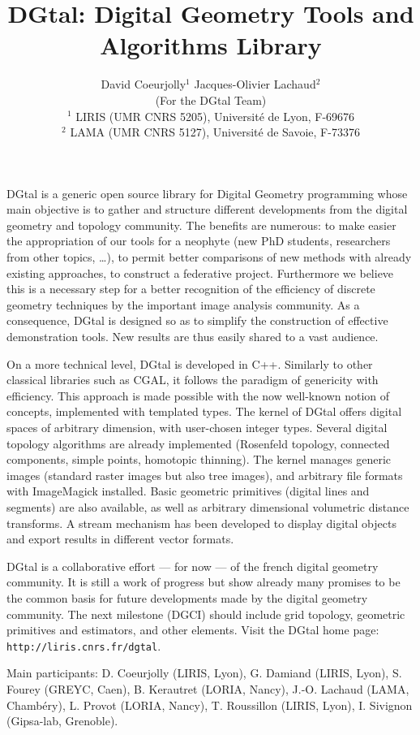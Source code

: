 \documentclass{article}
\title{DGtal: Digital  Geometry Tools and Algorithms Library}
\author{David Coeurjolly$^1$ \qquad \qquad Jacques-Olivier Lachaud$^2$ \\
  (For the DGtal Team)\\
${}^1$ LIRIS (UMR CNRS 5205), Universit\'{e} de Lyon, F-69676 \\
${}^2$ LAMA (UMR CNRS 5127), Universit\'{e} de Savoie, F-73376\\
}
\date{}
\begin{document}
\maketitle

DGtal is a generic open source library for Digital Geometry
programming whose main objective is to gather and structure different
developments from the digital geometry and topology community. The
benefits are numerous: to make easier the appropriation of our tools
for a neophyte (new PhD students, researchers from other topics,
\ldots), to permit better comparisons of new methods with already
existing approaches, to construct a federative project. Furthermore we
believe this is a necessary step for a better recognition of the
efficiency of discrete geometry techniques by the important image
analysis community. As a consequence, DGtal is designed so as to
simplify the construction of effective demonstration tools. New
results are thus easily shared to a vast audience. 

On a more technical level, DGtal is developed in C++. Similarly to
other classical libraries such as CGAL, it follows the paradigm of
genericity with efficiency. This approach is made possible with the
now well-known notion of concepts, implemented with templated
types. The kernel of DGtal offers digital spaces of arbitrary
dimension, with user-chosen integer types. Several digital topology
algorithms are already implemented (Rosenfeld topology, connected
components, simple points, homotopic thinning). The kernel manages
generic images (standard raster images but also tree images), and
arbitrary file formats with ImageMagick installed. Basic geometric
primitives (digital lines and segments) are also available, as well as
arbitrary dimensional volumetric distance transforms. A stream
mechanism has been developed to display digital objects and export
results in different vector formats.

DGtal is a collaborative effort --- for now --- of the french digital
geometry community. It is still a work of progress but show already
many promises to be the common basis for future developments made by
the digital geometry community. The next milestone (DGCI) should
include grid topology, geometric primitives and estimators, and other
elements. Visit the DGtal home page: \texttt{http://liris.cnrs.fr/dgtal}.

Main participants: D. Coeurjolly (LIRIS, Lyon), G. Damiand (LIRIS,
Lyon), S. Fourey (GREYC, Caen), B. Kerautret (LORIA, Nancy),
J.-O. Lachaud (LAMA, Chambéry), L. Provot (LORIA, Nancy),
T. Roussillon (LIRIS, Lyon), I. Sivignon (Gipsa-lab, Grenoble).
\end{document}
